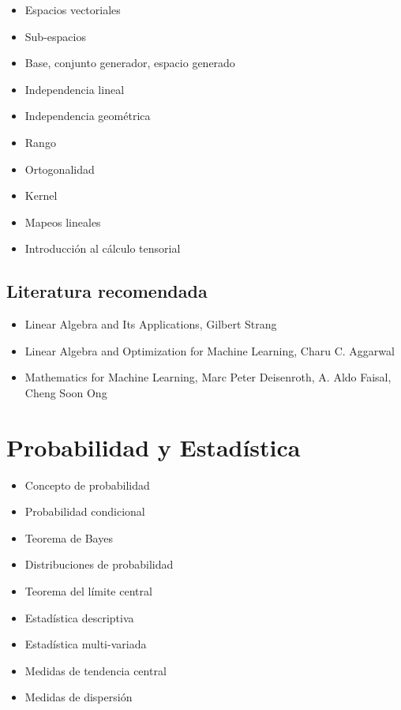 \documentclass{article}
\begin{document}
        \begin{itemize}
            \item Espacios vectoriales
            \item Sub-espacios
            \item Base, conjunto generador, espacio generado
            \item Independencia lineal
            \item Independencia geométrica
            \item Rango
            \item Ortogonalidad
            \item Kernel
            \item Mapeos lineales
            \item Introducción al cálculo tensorial
        \end{itemize}

        \subsection{Literatura recomendada}

            \begin{itemize}
                \item Linear Algebra and Its Applications, Gilbert Strang \cite{strang2006linear}
                \item Linear Algebra and Optimization for Machine Learning, Charu C. Aggarwal \cite{aggarwal2020linear}
                \item Mathematics for Machine Learning, Marc Peter Deisenroth, A. Aldo Faisal, Cheng Soon Ong \cite{deisenroth2020mathematics}
            \end{itemize}

    \section{Probabilidad y Estadística}

        \begin{itemize}
            \item Concepto de probabilidad
            \item Probabilidad condicional
            \item Teorema de Bayes
            \item Distribuciones de probabilidad
            \item Teorema del límite central
            \item Estadística descriptiva
            \item Estadística multi-variada
            \item Medidas de tendencia central
            \item Medidas de dispersión
        \end{itemize}
\end{document}
